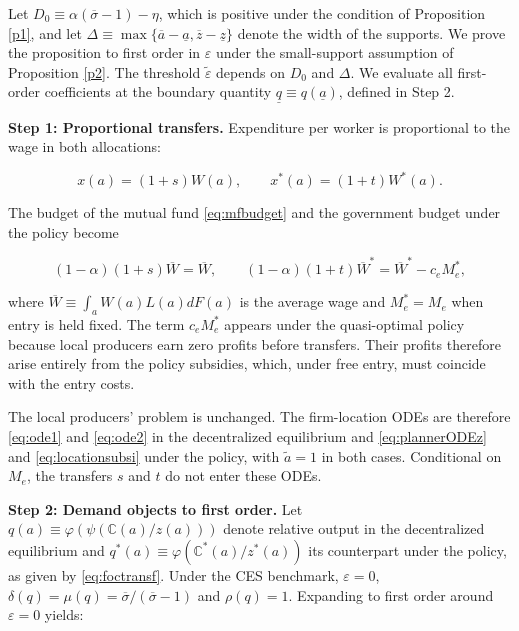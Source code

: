 Let $D_0 \equiv \alpha(\overline{\sigma} - 1) - \eta$, which is positive under the condition of Proposition \ref{p1}, and let $\Delta \equiv \max\{\overline{a} - \underline{a}, \overline{z} - \underline{z}\}$ denote the width of the supports. We prove the proposition to first order in $\varepsilon$ under the small-support assumption of Proposition \ref{p2}. The threshold $\widetilde{\varepsilon}$ depends on $D_0$ and $\Delta$. We evaluate all first-order coefficients at the boundary quantity $\underline q \equiv q(\underline a)$, defined in Step 2.

\noindent \textbf{Step 1: Proportional transfers.} Expenditure per worker is proportional to the wage in both allocations:

\begin{equation}\label{eq:propexp}
x(a) = (1+s) W(a), \qquad x^*(a) = (1+t) W^*(a).
\end{equation}

The budget of the mutual fund \eqref{eq:mfbudget} and the government budget under the policy become

\begin{equation}\label{eq:propbudget}
(1-\alpha)(1+s) \overline{W} = \overline{W}, \qquad (1-\alpha)(1+t) \overline{W}^* = \overline{W}^* - c_e M_e^*,
\end{equation}

where $\overline{W} \equiv \int_a W(a) L(a) dF(a)$ is the average wage and $M_e^* = M_e$ when entry is held fixed. The term $c_e M_e^*$ appears under the quasi-optimal policy because local producers earn zero profits before transfers. Their profits therefore arise entirely from the policy subsidies, which, under free entry, must coincide with the entry costs. 

The local producers’ problem is unchanged. The firm-location ODEs are therefore \eqref{eq:ode1} and \eqref{eq:ode2} in the decentralized equilibrium and \eqref{eq:plannerODEz} and \eqref{eq:locationsubsi} under the policy, with $\widetilde{a}=1$ in both cases. Conditional on $M_e$, the transfers $s$ and $t$ do not enter these ODEs.

\noindent \textbf{Step 2: Demand objects to first order.} Let $q(a) \equiv \varphi\left(\psi\left(\mathbb{C}(a)/z(a)\right)\right)$ denote relative output in the decentralized equilibrium and $q^*(a) \equiv \varphi\left(\mathbb{C}^*(a)/z^*(a)\right)$ its counterpart under the policy, as given by \eqref{eq:foctransf}. Under the CES benchmark, $\varepsilon = 0$, $\delta(q) = \mu(q) = \overline{\sigma}/(\overline{\sigma} - 1)$ and $\rho(q) = 1$. Expanding to first order around $\varepsilon = 0$ yields:

